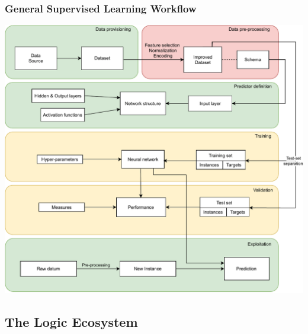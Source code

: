 \documentclass[presentation]{beamer}\mode<presentation>{\usetheme{AMSBolognaFC}}
\begin{document}
\begin{frame}%
\frametitle{General Supervised Learning Workflow}

    \begin{center}
        \includegraphics[width=.7\linewidth]{figures/phases1.pdf}
    \end{center}

\end{frame}

\subsection{The \twopkt{} Logic Ecosystem}
\end{document}
